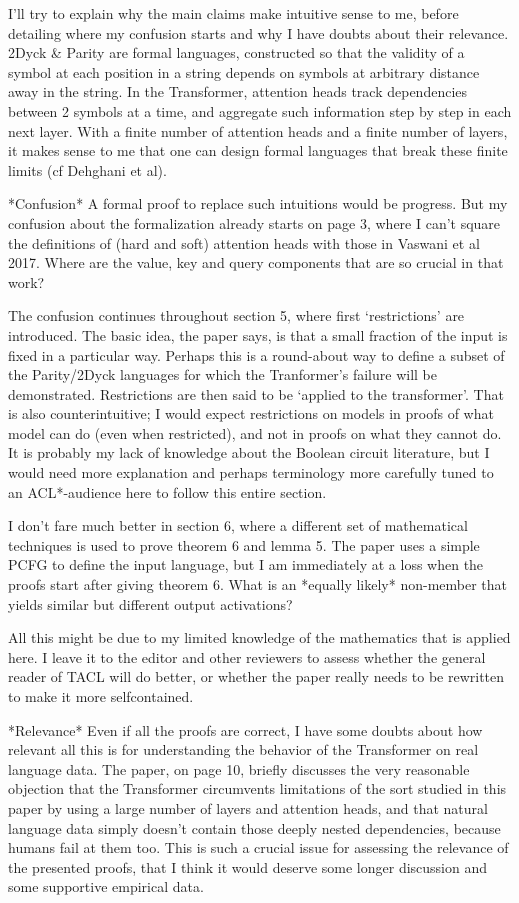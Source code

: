 \documentclass[11pt,a4paper]{article}
\newcounter{theorem}
\begin{document}
I’ll try to explain why the main claims make intuitive sense to me, before
detailing where my confusion starts and why I have doubts about their
relevance. 2Dyck & Parity are formal languages, constructed so that the
validity of a symbol at each position in a string depends on symbols at
arbitrary distance away in the string. In the Transformer, attention heads
track dependencies between 2 symbols at a time, and aggregate such
information step by step in each next layer. With a finite number of
attention heads and a finite number of layers, it makes sense to me that one
can design formal languages that break these finite limits (cf Dehghani et
al).

*Confusion*
A formal proof to replace such intuitions would be progress. But my
confusion about the formalization already starts on page 3, where I can’t
square the definitions of (hard and soft) attention heads with those in
Vaswani et al 2017. Where are the value, key and query components that are
so crucial in that work?

The confusion continues throughout section 5, where first ‘restrictions’
are introduced. The basic idea, the paper says, is that a small fraction of
the input is fixed in a particular way. Perhaps this is a round-about way to
define a subset of the Parity/2Dyck languages for which the Tranformer’s
failure will be demonstrated. Restrictions are then said to be ‘applied to
the transformer’. That is also counterintuitive; I would expect
restrictions on models in proofs of what model can do (even when
restricted), and not in proofs on what they cannot do. It is probably my
lack of knowledge about the Boolean circuit literature, but I would need
more explanation and perhaps terminology more carefully tuned to an
ACL*-audience here to follow this entire section.

I don’t fare much better in section 6, where a different set of
mathematical techniques is used to prove theorem 6 and lemma 5. The paper
uses a simple PCFG to define the input language, but I am immediately at a
loss when the proofs start after giving theorem 6. What is an *equally
likely* non-member that yields similar but different output activations?

All this might be due to my limited knowledge of the mathematics that is
applied here. I leave it to the editor and other reviewers to assess whether
the general reader of TACL will do better, or whether the paper really needs
to be rewritten to make it more selfcontained.

*Relevance*
Even if all the proofs are correct, I have some doubts about how relevant
all this is for understanding the behavior of the Transformer on real
language data. The paper, on page 10, briefly discusses the very reasonable
objection that the Transformer circumvents limitations of the sort studied
in this paper by using a large number of layers and attention heads, and
that natural language data simply doesn’t contain those deeply nested
dependencies, because humans fail at them too. This is such a crucial issue
for assessing the relevance of the presented proofs, that I think it would
deserve some longer discussion and some supportive empirical data.
\end{document}
